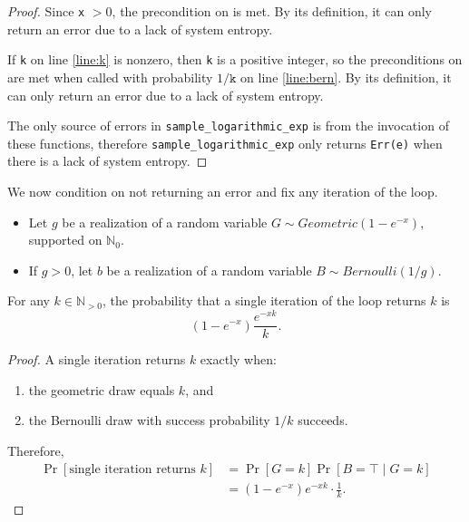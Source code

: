 \documentclass{article}
\begin{document}
\begin{proof}
Since \texttt{x} $> 0$, the precondition on
is met. By its definition, it can only return an error due to a lack of system entropy.

If \texttt{k} on line \ref{line:k} is nonzero, then \texttt{k} is a positive integer, so
the preconditions on 
are met when called with probability $1/\texttt{k}$ on line \ref{line:bern}. By its definition,
it can only return an error due to a lack of system entropy.

The only source of errors in \texttt{sample\_logarithmic\_exp} is from the invocation of these
functions, therefore \texttt{sample\_logarithmic\_exp} only returns \texttt{Err(e)} when there is
a lack of system entropy.
\end{proof}

We now condition on not returning an error and fix any iteration of the loop.

\begin{itemize}
    \item Let $g$ be a realization of a random variable $G \sim Geometric(1 - e^{-x})$,
    supported on $\mathbb{N}_0$.
    \item If $g > 0$, let $b$ be a realization of a random variable
    $B \sim Bernoulli(1/g)$.
\end{itemize}

\begin{lemma}
\label{one-step-return}
For any $k \in \mathbb{N}_{>0}$, the probability that a single iteration of the loop returns $k$ is
\[
(1 - e^{-x}) \frac{e^{-xk}}{k}.
\]
\end{lemma}

\begin{proof}
A single iteration returns $k$ exactly when:
\begin{enumerate}
    \item the geometric draw equals $k$, and
    \item the Bernoulli draw with success probability $1/k$ succeeds.
\end{enumerate}
Therefore,
\begin{align*}
\Pr[\text{single iteration returns } k]
&= \Pr[G = k] \Pr[B = \top \mid G = k] \\
&= (1 - e^{-x}) e^{-xk} \cdot \frac{1}{k}.
\end{align*}
\end{proof}
\end{document}
